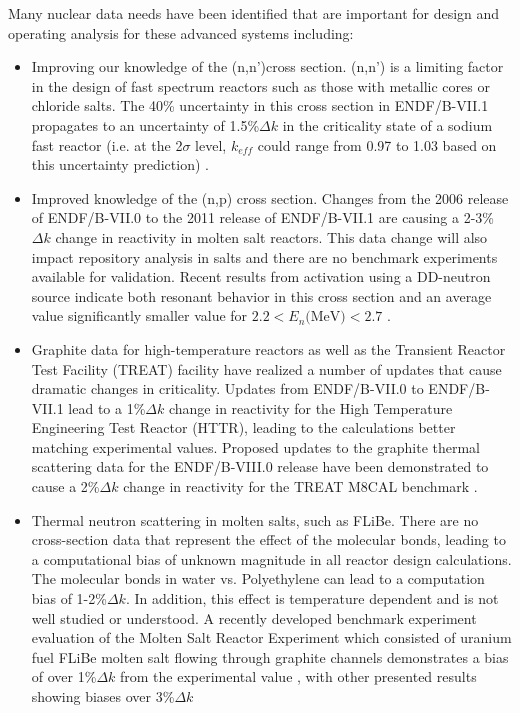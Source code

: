 \documentclass[letterpaper]{ar-1col}
\begin{document}
Many nuclear data needs have been identified that are important for design and operating analysis for these advanced systems including:
\begin{itemize}
  \item Improving our knowledge of the (n,n')cross section.   (n,n') is a limiting factor in the design of fast spectrum reactors such as those with metallic cores or chloride salts. The 40\% uncertainty in this cross section in ENDF/B-VII.1 propagates to an uncertainty of 1.5\%$\Delta k$ in the criticality state of a sodium fast reactor (i.e. at the 2$\sigma$ level, $k_{eff}$ could range from 0.97 to 1.03 based on this uncertainty prediction) \cite{touran2016sensitivities}.
  \item Improved knowledge of the (n,p) cross section.  Changes from the 2006 release of ENDF/B-VII.0 to the 2011 release of ENDF/B-VII.1 are causing a 2-3\%$\Delta k$ change in reactivity in molten salt reactors. This data change will also impact repository analysis in salts and there are no benchmark experiments available for validation. Recent results from activation using a DD-neutron source \cite{Voyles2017} indicate both resonant behavior in this cross section and an average value significantly smaller value for  $2.2 < E_n \text{(MeV)} < 2.7$ \cite{Bat18}.  
  \item Graphite data for high-temperature reactors as well as the Transient Reactor Test Facility (TREAT) facility have realized a number of updates that cause dramatic changes in criticality. Updates from ENDF/B-VII.0 to ENDF/B-VII.1 lead to a 1\%$\Delta k$ change in reactivity for the High Temperature Engineering Test Reactor (HTTR), leading to the calculations better matching experimental values. Proposed updates to the graphite thermal scattering data for the ENDF/B-VIII.0 release have been demonstrated to cause a 2\%$\Delta k$ change in reactivity for the TREAT M8CAL benchmark \cite{hawarithermal}.
  \item Thermal neutron scattering in molten salts, such as FLiBe. There are no cross-section data that represent the effect of the molecular bonds, leading to a computational bias of unknown magnitude in all reactor design calculations. The molecular bonds in water vs. Polyethylene can lead to a computation bias of 1-2\%$\Delta k$.  In addition, this effect is temperature dependent and is not well studied or understood. A recently developed benchmark experiment evaluation of the Molten Salt Reactor Experiment which consisted of uranium fuel FLiBe molten salt flowing through graphite channels demonstrates a bias of over 1\%$\Delta k$ from the experimental value \cite{shenzero}, with other presented results showing biases over 3\%$\Delta k$

\end{itemize}
\end{document}
